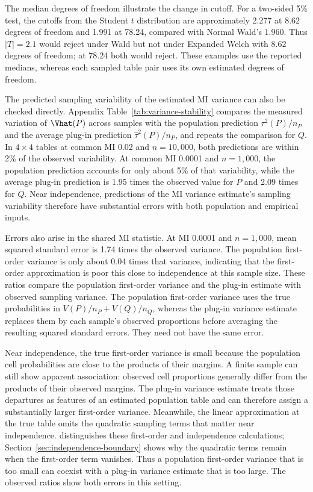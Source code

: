 The median degrees of freedom illustrate the change in cutoff. For a
two-sided 5\% test, the cutoffs from the Student \(t\) distribution
are approximately 2.277 at 8.62 degrees of freedom and 1.991 at 78.24,
compared with Normal Wald's 1.960. Thus \(|T|=2.1\) would reject under
Wald but not under Expanded Welch with 8.62 degrees of freedom; at
78.24 both would reject. These examples use the reported medians,
whereas each sampled table pair uses its own estimated degrees of freedom.

The predicted sampling variability of the estimated MI variance can also
be checked directly. Appendix Table~\ref{tab:variance-stability} compares
the measured variation of \(\Vhat(P)\) across samples with the population prediction
\(\tau^2(P)/n_P\) and the average plug-in prediction
\(\widehat\tau^2(P)/n_P\), and repeats the comparison for \(Q\).
In \(4\times4\) tables at common MI 0.02 and \(n=10{,}000\), both
predictions are within 2\% of the observed variability. At common MI
0.0001 and \(n=1{,}000\), the population prediction accounts for only
about 5\% of that variability, while the average plug-in prediction is
1.95 times the observed value for \(P\) and 2.09 times for \(Q\).
Near independence, predictions of the MI variance estimate's sampling
variability therefore have substantial errors with both population and
empirical inputs.

Errors also arise in the shared MI statistic. At MI 0.0001 and
\(n=1{,}000\), mean squared standard
error is 1.74 times the observed variance. The population first-order
variance is only about 0.04 times that variance, indicating that the
first-order approximation is poor this close to independence at this
sample size. These ratios compare the population first-order variance and
the plug-in estimate with observed sampling variance. The population
first-order variance uses the true probabilities in \(V(P)/n_P+V(Q)/n_Q\),
whereas the plug-in variance estimate replaces them by each sample's observed
proportions before averaging the resulting squared standard errors.
They need not have the same error.

Near independence, the true first-order variance is small because the
population cell probabilities are close to the products of their
margins. A finite sample can still show apparent association: observed
cell proportions generally differ from the products of their observed
margins. The plug-in variance estimate treats those departures as features
of an estimated population table and can therefore assign a substantially
larger first-order variance. Meanwhile, the linear approximation at the
true table omits the quadratic sampling terms that matter near
independence. \citet{brillinger2004} distinguishes these first-order and
independence calculations; Section~\ref{sec:independence-boundary}
shows why the quadratic terms remain when the first-order term vanishes.
Thus a population first-order variance that is too small can coexist
with a plug-in variance estimate that is too large. The observed ratios
show both errors in this setting.

